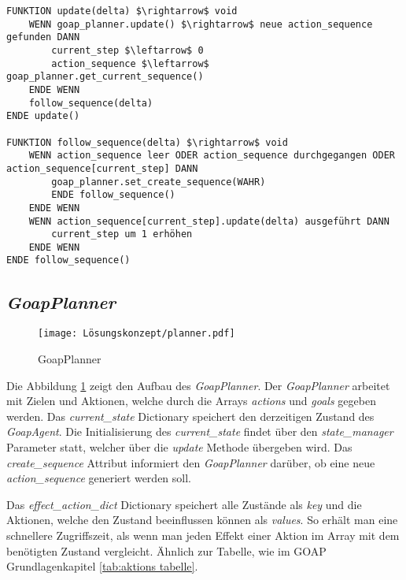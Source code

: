\begin{lstlisting}[language=Pseudo, caption={update Methode des GoapAgent}, mathescape=true, label={lst:pseudo update}]
FUNKTION update(delta) $\rightarrow$ void
    WENN goap_planner.update() $\rightarrow$ neue action_sequence gefunden DANN
        current_step $\leftarrow$ 0
        action_sequence $\leftarrow$ goap_planner.get_current_sequence()
    ENDE WENN
    follow_sequence(delta)
ENDE update()

FUNKTION follow_sequence(delta) $\rightarrow$ void
	WENN action_sequence leer ODER action_sequence durchgegangen ODER action_sequence[current_step] DANN
		goap_planner.set_create_sequence(WAHR)
		ENDE follow_sequence()
	ENDE WENN
	WENN action_sequence[current_step].update(delta) ausgeführt DANN
		current_step um 1 erhöhen
	ENDE WENN
ENDE follow_sequence()
\end{lstlisting}














\subsection{\textit{GoapPlanner}}
\label{chap:goapplanner uml}


\begin{figure}[h]
  \centering
  \texttt{[image: Lösungskonzept/planner.pdf]}
	\captionsetup{justification=justified, format=plain}
  \caption{GoapPlanner}
  \label{fig:goapplanner uml}
\end{figure}

Die Abbildung \ref{fig:goapplanner uml} zeigt den Aufbau des \textit{GoapPlanner}. Der \textit{GoapPlanner} arbeitet mit Zielen und Aktionen, welche durch die Arrays \textit{actions} und \textit{goals} gegeben werden. Das \textit{current\_state} Dictionary speichert den derzeitigen Zustand des \textit{GoapAgent}. Die Initialisierung des \textit{current\_state} findet über den \textit{state\_manager} Parameter statt, welcher über die \textit{update} Methode übergeben wird. Das \textit{create\_sequence} Attribut informiert den \textit{GoapPlanner} darüber, ob eine neue \textit{action\_sequence} generiert werden soll. 

Das \textit{effect\_action\_dict} Dictionary speichert alle Zustände als \textit{key} und die Aktionen, welche den Zustand beeinflussen können als \textit{values}. So erhält man eine schnellere Zugriffszeit, als wenn man jeden Effekt einer Aktion im Array mit dem benötigten Zustand vergleicht. \"{A}hnlich zur Tabelle, wie im GOAP Grundlagenkapitel \ref{tab:aktions tabelle}.

